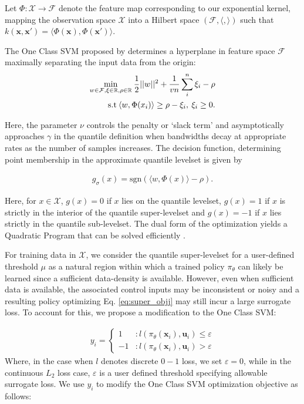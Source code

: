 \documentclass[10pt, conference]{ieeeconf}      %
\newcommand{\bu}{\mathbf{u}}
\newcommand{\bx}{\mathbf{x}}
\begin{document}
Let $\Phi:\mathcal{X}\to \mathcal{F}$ denote the feature map corresponding to our exponential kernel, mapping the
observation space $\mathcal{X}$ into a Hilbert space $(\mathcal{F}, \langle, \rangle)$ such that $k(\bx, \bx') = \langle
\Phi(\bx), \Phi(\bx')\rangle$.

The One Class SVM proposed by \cite{scholkopf2001estimating} determines a hyperplane in feature space $\mathcal{F}$
maximally separating the input data from the origin:
\vspace{-2ex}
\begin{align}\label{eq:primal_sup}
    \underset{w\in \mathcal{F}, \mathbf{\xi} \in \mathbb{R}, \rho \in \mathbb{R}}{\mbox{min}}\: \frac{1}{2}||w||^2+\frac{1}{vn} \sum^n_i \xi_i - \rho\\
\mbox{s.t} \: \langle w,\Phi(x_i) \rangle \geq \rho - \xi_i, \: \xi_i \geq 0 \notag.
\end{align}

Here, the parameter $\nu$ controls the penalty or `slack term' and asymptotically approaches $\gamma$ \cite{vert2006consistency}
in the quantile definition when bandwidths decay at appropriate rates as the number of samples increases. The decision
function, determining point membership in the approximate quantile levelset is given by

\vspace{-2ex}
\begin{align}\label{eq:decision_func}
g_{\sigma}(x) = \mbox{sgn}(\langle w,\Phi(x) \rangle-\rho).
\end{align}


Here, for $x\in \mathcal{X}$, $g(x)=0$ if $x$ lies on the quantile levelset,
$g(x) = 1$ if $x$ is strictly in the interior of the quantile super-levelset and $g(x) = -1$ 
if $x$ lies strictly in the quantile sub-levelset. The dual form of the optimization yields a Quadratic Program 
that can be solved efficiently \cite{scholkopf2001estimating}. 

For training data in $\mathcal{X}$, we consider the quantile super-levelset for a user-defined threshold $\mu$ as a natural region within which
a trained policy $\pi_{\theta}$ can likely be learned since a sufficient data-density is available.
However, even when sufficient data is available, the associated control inputs may be inconsistent or noisy and a resulting policy
optimizing Eq. \ref{eq:super_objj} may still incur a large surrogate loss. To account for this, we propose a
modification to the One Class SVM:

\begin{align}
y_i = \left\{
     \begin{array}{lr}
         1 & : l(\pi_{\theta}(\bx_i),\bu_i)\le \varepsilon\\
         -1 & : l(\pi_{\theta}(\bx_i),\bu_i)>\varepsilon
     \end{array}
   \right.
\end{align}
Where, in the case when $l$ denotes discrete $0-1$ loss, we set $\varepsilon = 0$, while in the continuous $L_2$ loss
case, $\varepsilon$ is a user defined threshold specifying allowable surrogate loss.
We use $y_i$ to modify the One Class SVM optimization objective as follows: 
\end{document}
